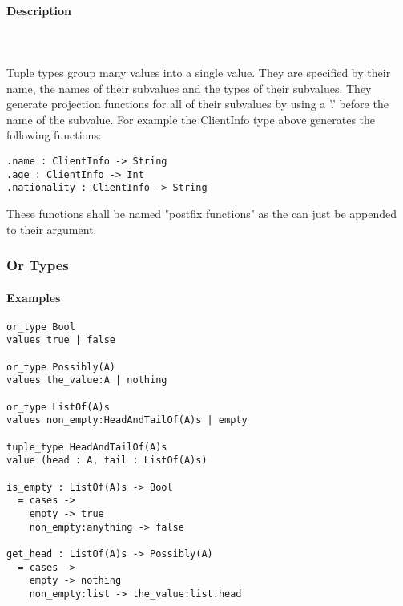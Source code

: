 \documentclass{article}
\def\pend{\mbox{} \\\\}
\begin{document}
\paragraph{Description}\pend
Tuple types group many values into a single value. They are specified by their name,
the names of their subvalues and the types of their subvalues. They generate 
projection functions for all of their subvalues by using a '.' before the name of 
the subvalue. For example the ClientInfo type above generates the following 
functions:
\begin{verbatim}
.name : ClientInfo -> String
.age : ClientInfo -> Int
.nationality : ClientInfo -> String
\end{verbatim}
These functions shall be named "postfix functions" as the can just be appended to
their argument.

\subsubsection{Or Types}

\paragraph{Examples}

\begin{verbatim}
or_type Bool
values true | false

or_type Possibly(A)
values the_value:A | nothing

or_type ListOf(A)s
values non_empty:HeadAndTailOf(A)s | empty

tuple_type HeadAndTailOf(A)s
value (head : A, tail : ListOf(A)s)

is_empty : ListOf(A)s -> Bool
  = cases -> 
    empty -> true
    non_empty:anything -> false

get_head : ListOf(A)s -> Possibly(A)
  = cases -> 
    empty -> nothing
    non_empty:list -> the_value:list.head
\end{verbatim}
\end{document}
